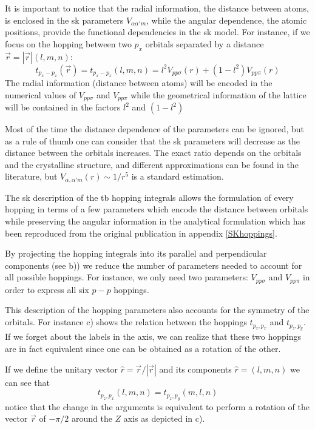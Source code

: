 It is important to notice that the radial information, \ie the distance between atoms, is enclosed in the \ac{sk} parameters $V_{\alpha\alpha'm}$, while the angular dependence, \ie the atomic positions, provide the functional dependencies in the \ac{sk} model. For instance, if we focus on the hopping between two $p_x$ orbitals\cite{Slater1954} separated by a distance $\vec{r}=|\vec{r}|(l,m,n)$:
\begin{equation}
  t_{p_x-p_x}(\vec{r})=  t_{p_x-p_x}(l,m,n) = l^2 V_{pp\sigma}(r) + (1-l^2) V_{pp\pi}(r)
\end{equation}
The radial information (distance between atoms) will be encoded in the numerical values of $V_{pp\sigma}$ and $V_{pp\pi}$ while the geometrical information of the lattice will be contained in the factors $l^2$ and $(1-l^2)$

Most of the time the distance dependence of the parameters can be ignored, but as a rule of thumb one can consider that the \ac{sk} parameters will decrease as the distance between the orbitals increases.
The exact ratio depends on the orbitals and the crystalline structure, and different approximations can be found in the literature\cite{Harrison1930}, but $V_{\alpha,\alpha'm}(r)\sim1/r^5$ is a standard estimation.
\bigbreak


The \ac{sk} description of the \ac{tb} hopping integrals allows the formulation of every hopping in terms of a few parameters which encode the distance between orbitals while preserving the angular information in the analytical formulation which has been reproduced from the original publication in appendix \ref{SKhoppings}.
\medbreak


By projecting the hopping integrals into its parallel and perpendicular components (see b)) we reduce the number of parameters needed to account for all possible hoppings. For instance, we only need two parameters: $V_{pp\sigma}$ and $V_{pp\pi}$ in order to express all six $p-p$ hoppings.

This description of the hopping parameters also accounts for the symmetry of the orbitals. For instance c) shows the relation between the hoppings $t_{p_{z},p_{x}}$ and $t_{p_{z},p_{y}}$. If we forget about the labels in the axis, we can realize that these two hoppings are in fact equivalent since one can be obtained as a rotation of the other.

If we define the unitary vector $\hat{r} = \vec{r}/|\vec{r}|$ and its components $\hat{r}=(l,m,n)$ we can see that
\begin{equation}
  t_{p_{z},p_{x}} (l,m,n) = t_{p_{z},p_{y}}(m,l,n)
\end{equation}
notice that the change in the arguments is equivalent to perform a rotation of the vector $\vec{r}$ of $-\pi/2$ around the $Z$ axis as depicted in c).

